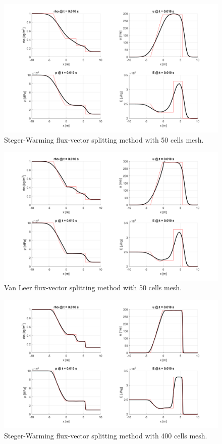 \begin{figure}[H]
    \centering
    \includegraphics[width=\textwidth]{img/states/SW50.png}
    \caption{Steger-Warming flux-vector splitting method with 50 cells mesh.}
    \label{fig:SW50}
\end{figure}

\begin{figure}[H]
    \centering
    \includegraphics[width=\textwidth]{img/states/VL50.png}
    \caption{Van Leer flux-vector splitting method with 50 cells mesh.}
    \label{fig:VL50}
\end{figure}

\begin{figure}[H]
    \centering
    \includegraphics[width=\textwidth]{img/states/SW400.png}
    \caption{Steger-Warming flux-vector splitting method with 400 cells mesh.}
    \label{fig:SW400}
\end{figure}

